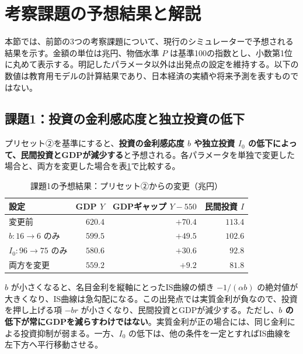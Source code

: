 \documentclass[lualatex,a4paper,11pt,ja=standard]{bxjsarticle}
\begin{document}
\clearpage
\section{考察課題の予想結果と解説}
\label{sec:expected_results}

本節では、前節の3つの考察課題について、現行のシミュレーターで予想される結果を示す。金額の単位は兆円、物価水準 $P$ は基準100の指数とし、小数第1位に丸めて表示する。明記したパラメータ以外は出発点の設定を維持する。以下の数値は教育用モデルの計算結果であり、日本経済の実績や将来予測を表すものではない。

\subsection{課題1：投資の金利感応度と独立投資の低下}

プリセット②を基準にすると、\textbf{投資の金利感応度 $b$ や独立投資 $I_0$ の低下によって、民間投資とGDPが減少する}と予想される。各パラメータを単独で変更した場合と、両方を変更した場合を表\ref{tab:expected_investment}で比較する。

\begin{table}[htbp]
\centering
\caption{課題1の予想結果：プリセット②からの変更（兆円）}
\label{tab:expected_investment}
\small
\begin{tabular}{@{}lrrr@{}}
\toprule
\textbf{設定} & \textbf{GDP $Y$} & \textbf{GDPギャップ $Y-550$} & \textbf{民間投資 $I$} \\
\midrule
変更前 & $620.4$ & $+70.4$ & $113.4$ \\
$b:16\to6$ のみ & $599.5$ & $+49.5$ & $102.6$ \\
$I_0:96\to75$ のみ & $580.6$ & $+30.6$ & $92.8$ \\
両方を変更 & $559.2$ & $+9.2$ & $81.8$ \\
\bottomrule
\end{tabular}
\end{table}

$b$ が小さくなると、名目金利を縦軸にとったIS曲線の傾き $-1/(\alpha b)$ の絶対値が大きくなり、IS曲線は急勾配になる。この出発点では実質金利が負なので、投資を押し上げる項 $-br$ が小さくなり、民間投資とGDPが減少する。ただし、\textbf{$b$ の低下が常にGDPを減らすわけではない}。実質金利が正の場合には、同じ金利による投資抑制が弱まる。一方、$I_0$ の低下は、他の条件を一定とすればIS曲線を左下方へ平行移動させる。
\end{document}
